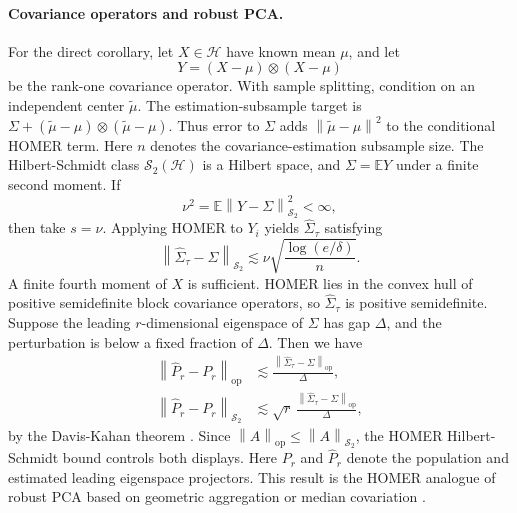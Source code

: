 \documentclass[twoside]{article}
\theoremstyle{definition}
\newcommand{\Hcal}{\mathcal H}
\newcommand{\E}{\mathbb E}
\newcommand{\norm}[1]{\left\lVert #1\right\rVert}
\newcommand{\op}{\mathrm{op}}
\begin{document}
\paragraph{Covariance operators and robust PCA.}
For the direct corollary, let $X\in\Hcal$ have known mean $\mu$, and let
\[
    Y=(X-\mu)\otimes (X-\mu)
\]
be the rank-one covariance operator. With sample splitting, condition on an independent center $\tilde\mu$. The estimation-subsample target is $\Sigma+(\tilde\mu-\mu)\otimes(\tilde\mu-\mu)$. Thus error to $\Sigma$ adds $\norm{\tilde\mu-\mu}^2$ to the conditional HOMER term. Here $n$ denotes the covariance-estimation subsample size. The Hilbert-Schmidt class $\mathcal S_2(\Hcal)$ is a Hilbert space, and $\Sigma=\E Y$ under a finite second moment. If
\[
    \nu^2=\E\norm{Y-\Sigma}_{\mathcal S_2}^2<\infty,
\]
then take $s=\nu$. Applying HOMER to $Y_i$ yields $\hat\Sigma_\tau$ satisfying
\begin{equation*}
    \norm{\hat\Sigma_\tau-\Sigma}_{\mathcal S_2}
    \lesssim
    \nu\sqrt{\frac{\log(e/\delta)}{n}}.
\end{equation*}
A finite fourth moment of $X$ is sufficient. HOMER lies in the convex hull of positive semidefinite block covariance operators, so $\hat\Sigma_\tau$ is positive semidefinite. Suppose the leading $r$-dimensional eigenspace of $\Sigma$ has gap $\Delta$, and the perturbation is below a fixed fraction of $\Delta$. Then we have 
\begin{align*}
    \norm{\hat P_r-P_r}_{\op}
    &\lesssim
    \frac{\norm{\hat\Sigma_\tau-\Sigma}_{\op}}{\Delta},\\
    \norm{\hat P_r-P_r}_{\mathcal S_2}
    &\lesssim
    \sqrt r\,\frac{\norm{\hat\Sigma_\tau-\Sigma}_{\op}}{\Delta},
\end{align*}
by the Davis-Kahan theorem \citep{davis_1970_RotationEigenvectorsPerturbation}. Since $\norm{A}_{\op}\le\norm{A}_{\mathcal S_2}$, the HOMER Hilbert-Schmidt bound controls both displays. Here $P_r$ and $\hat P_r$ denote the population and estimated leading eigenspace projectors. This result is the HOMER analogue of robust PCA based on geometric aggregation or median covariation \citep{minsker_2015_GeometricMedianRobust,cardot_2017_FastEstimationMedian}.
\end{document}

